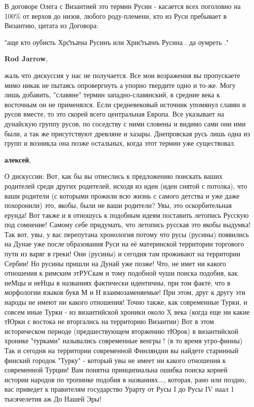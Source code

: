 \begin{itemize}
\begin{itemize}
В договоре Олега с Византией это термин Русин - касается всех поголовно на 100\%
от верхов до низов, любого роду-племени, кто из Руси пребывает в Византию,
цитата из Договора:

"аще кто оубиєть Хрс̑тьӕна Русинъ или Хрис̑тьӕнъ Русина . да оумреть ."

\textbf{Rod Jarrow}, 

жаль что дискуссия у нас не получается. Все мои возражения вы пропускаете мимо
никак не пытаясь опровергнуть а упорно твердите одно и то-же. Могу лишь
добавить, "славяне" термин западно-славянский, в средние века к восточным он не
применялся. Если средневековый источник упомянул славян и русов вместе, то это
скорей всего центральная Европа. Все указывает на дунайскую группу русов, по
соседству с ними словены и видимо сами они ими были, а так же присутствуют
древляне и хазары. Днепровская русь лишь одна из групп и возникла она позже
остальных, когда этот термин уже существовал.

\textbf{алексей}, 

О дискуссии: Вот, как бы вы отнеслись к предложению поискать ваших родителей
среди других родителей, исходя из идеи (идеи снятой с потолка), что ваши
родители (с которыми прожили всю жизнь с самого детства и уже даже похоронили)
это, якобы, были не ваши родители? Увы, это оскорбительная ерунда! Вот также и
я отношусь к подобным идеям поставить летопись Русскую под сомнение! Самому
себе придумать, что летопись русская это якобы выдумка! Так вот, увы, у вас
перепутана хронология потому что русы (русины) появились на Дунае уже после
образования Руси на её материнской территории торгового пути из варяг в греки!
Они (русины) и сегодня там проживают на территории Сербии! Но русины пришли на
Дунай уже позже! Что, не имет ни какого отношения к римским этРУСкам и тому
подобной чуши поиска подобия, как неМцы и неНцы в названиях фактически
идентичны, при том факте, что в морфологии языков букв М и Н взаимозаменяемые!
При этом, друг к другу эти народы не имеют ни какого отношения! Точно также,
как современные Турки, и совсем иные Турки - из византийской хроники около X
века (когда еще ни какие тЮрки с востока не вторгались на территорию Византии)
Вот в этом историческом периоде (предшествующем вторжению тЮрок) в византийской
хронике "турками" назывались современные венгры ! (в то время угро-финны) Так и
сегодня на территории современной Финляндии вы найдете старинный финский
городок "Турку" - который увы не имеет ни какого отношения к современной
Турции! Вам понятна принципиальна ошибка поиска корней истории народов по
тропинке подобия в названиях..., которая, рано или поздно, вас приведет к
правителям государство Урарту от Русы I до Русы IV наал 1 тысячелетия аж До
Нашей Эры!


\end{itemize}
\end{itemize}
